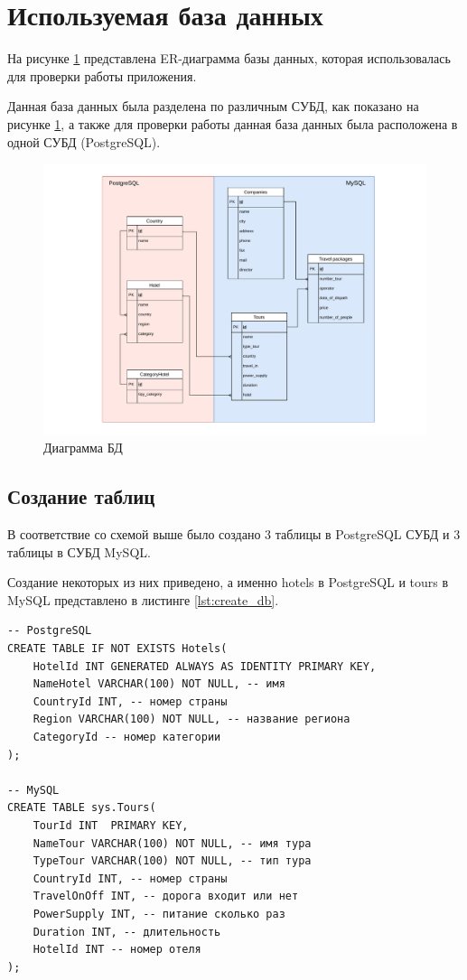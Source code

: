 \section{Используемая база данных}

На рисунке \ref{img:er_db} представлена ER-диаграмма базы данных, которая использовалась для проверки работы приложения.

Данная база данных была разделена по различным СУБД, как показано на рисунке \ref{img:er_db}, а также для проверки работы данная база данных была расположена в одной СУБД (PostgreSQL).

\begin{figure}[h!]
	\begin{center}
		\includegraphics[scale=0.7]{./inc/img/er_db.pdf}
		\caption{Диаграмма БД}
		\label{img:er_db}
	\end{center}
\end{figure}

\subsection{Создание таблиц}

В соответствие со схемой выше было создано 3 таблицы в PostgreSQL СУБД и 3 таблицы в СУБД MySQL.

Создание некоторых из них приведено, а именно hotels в PostgreSQL и tours в MySQL представлено в листинге \ref{lst:create_db}.

\begin{lstlisting}[label=lst:create_db,caption=Создание некоторых таблиц]
-- PostgreSQL
CREATE TABLE IF NOT EXISTS Hotels(
	HotelId INT GENERATED ALWAYS AS IDENTITY PRIMARY KEY,
	NameHotel VARCHAR(100) NOT NULL, -- имя
	CountryId INT, -- номер страны
	Region VARCHAR(100) NOT NULL, -- название региона
	CategoryId -- номер категории
);

-- MySQL
CREATE TABLE sys.Tours(
	TourId INT  PRIMARY KEY,
	NameTour VARCHAR(100) NOT NULL, -- имя тура
	TypeTour VARCHAR(100) NOT NULL, -- тип тура
	CountryId INT, -- номер страны
	TravelOnOff INT, -- дорога входит или нет
	PowerSupply INT, -- питание сколько раз
	Duration INT, -- длительность
	HotelId INT -- номер отеля
);

\end{lstlisting}

